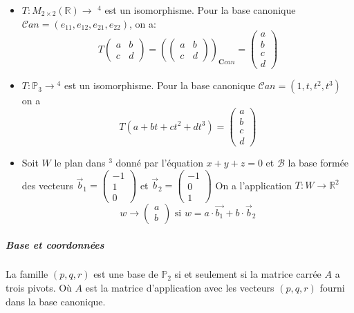 \begin{exemple}
    \begin{itemize}
        \item $T : M_{2\times2}(\mathbb{R}) \to $ \R$^4$ est un isomorphisme. Pour la base canonique $\mathcal{C}an = (e_{11}, e_{12}, e_{21}, e_{22})$, on a:
\[T\begin{pmatrix}
    a & b \\ c & d
\end{pmatrix} = \left ( \begin{pmatrix}
    a & b \\ c & d
\end{pmatrix}\right )_{\mathbf{C}can} = \begin{pmatrix}
    a \\ b \\ c \\ d
\end{pmatrix}\]
        \item $T : \mathbb{P}_3 \to $\R$^4$ est un isomorphisme. Pour la base canonique $\mathcal{C}an = (1, t, t^2, t^3)$ on a
\[T(a + bt + ct^2 + dt^3) = \begin{pmatrix}
    a \\ b \\ c \\ d
\end{pmatrix}\]
\item Soit $W$ le plan dans \R$^3$ donné par l'équation $x + y + z = 0$ et $\mathcal{B}$ la base formée des vecteurs $\vec{b}_1 = \begin{pmatrix}
    -1 \\ 1 \\ 0
\end{pmatrix}$ et $\vec{b}_2 =  \begin{pmatrix}
    -1 \\ 0 \\ 1
\end{pmatrix}$
On a l'application $T : W \to \mathbb{R}^2$
\[w \to \begin{pmatrix}
    a \\ b
\end{pmatrix} \text{ si } w = a\cdot\vec{b_1} + b\cdot\vec{b}_2\]
\end{itemize}

\end{exemple}


\subparagraph{Base et coordonnées}
\begin{definition}[pivots]
    La famille $(p, q, r)$ est une base de $\mathbb{P}_2$ si et seulement si la matrice carrée $A$ a trois pivots. Où $A$ est la matrice d'application avec les vecteurs $(p, q, r)$ fourni dans la base canonique.
\end{definition}

